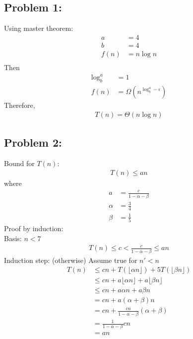 \documentclass{article}
\newcommand\floor[1]{\lfloor#1\rfloor}
\begin{document}
 

\hypertarget{}{}
\subsection*{{Problem 1: }}
\label{}
Using master theorem: \\
\begin{align*} 
a &=4 \\ 
b &= 4 \\ 
f(n) &= n\log{n} \\
\end{align*} 
Then \begin{align*} 
\log_b^a & = 1\\
f(n) &= \Omega(n^{\log_b^a-\epsilon})  
\end{align*} 
Therefore, \begin{align*} T(n) = \Theta(n\log{n}) \end{align*} 

\hypertarget{}{}
\subsection*{{Problem 2: }}

Bound for $T(n) $:   
\begin{align*} 
T(n)\leq an
\end{align*} 
where 
\begin{align*} a &= \frac{c}{1-\alpha-\beta} \\
\alpha &= \frac{3}{4}\\
\beta &= \frac{1}{5} 
\end{align*} 
Proof by induction: \\
Basis: $n<7$   
\begin{align*}
T(n)\leq c <\frac{c}{1-\alpha-\beta} \leq an
\end{align*}
Induction step: (otherwise) Assume true for $n'<n$ 
\begin{align*} 
T(n)& \leq cn + T(\floor{\alpha n}) + 5T(\floor{\beta n}) \\
& \leq cn + a \floor{\alpha n}  + a \floor{\beta n} \\
& \leq cn + a\alpha n + a \beta n \\
&= cn + a(\alpha + \beta) n \\
& = cn + \frac{cn}{1-\alpha -\beta} (\alpha + \beta) \\
& = \frac{1}{1-\alpha-\beta} cn \\
& = an 
\end{align*} 
\end{document}
